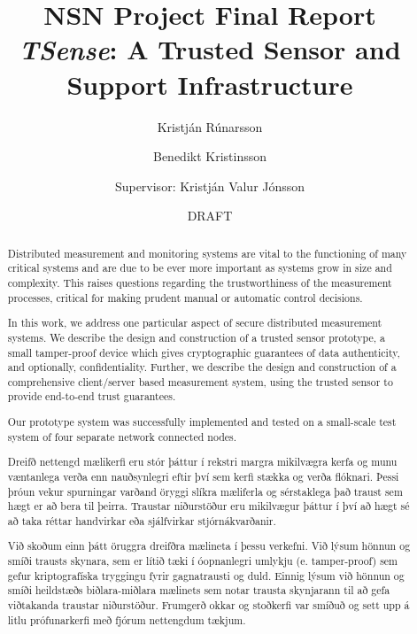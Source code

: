 \documentclass[10pt,titlepage,twoside,a4paper]{report}
\author{Kristj\'{a}n R\'{u}narsson \and Benedikt Kristinsson\\\and Supervisor: Kristj\'{a}n Valur J\'{o}nsson}
\title{NSN Project Final Report\\\textit{TSense}: A Trusted Sensor and Support Infrastructure}
\date{DRAFT}
\begin{document}
\maketitle
\begin{titlepage}
\end{titlepage}
\newpage
\ \ \ \\
\newpage

\setcounter{page}{1}

\tableofcontents

\begin{abstract}
Distributed measurement and monitoring systems are vital to the functioning of many critical systems and are due to be ever more important as systems grow in size and complexity. This raises questions regarding the trustworthiness of the measurement processes, critical for making prudent manual or automatic control decisions. 

In this work, we address one particular aspect of secure distributed measurement systems. We describe the design and construction of a trusted sensor prototype, a small tamper-proof device which gives cryptographic guarantees of data authenticity, and optionally, confidentiality. Further, we describe the design and construction of a comprehensive client/server based measurement system, using the trusted sensor to provide end-to-end trust guarantees. 


%
Our prototype system was successfully implemented and tested on a small-scale test system of four separate network connected nodes.
\end{abstract}

\renewcommand{\abstractname}{{\'{U}}tdr\'{a}ttur}
\begin{abstract}
Dreifð nettengd mælikerfi eru stór þáttur í rekstri margra mikilvægra kerfa og munu væntanlega verða enn nauðsynlegri eftir því sem kerfi stækka og verða flóknari. Þessi þróun vekur spurningar varðand öryggi slíkra mæliferla og sérstaklega það traust sem hægt er að bera til þeirra. Traustar niðurstöður eru mikilvægur þáttur í því að hægt sé að taka réttar handvirkar eða sjálfvirkar stjórnákvarðanir.

Við skoðum einn þátt öruggra dreifðra mælineta í þessu verkefni. Við lýsum hönnun og smíði trausts skynara, sem er lítið tæki í óopnanlegri umlykju (e. tamper-proof) sem gefur kriptografíska tryggingu fyrir gagnatrausti og duld. Einnig lýsum við hönnun og smíði heildstæðs biðlara-miðlara mælinets sem  notar trausta skynjarann til að gefa viðtakanda traustar niðurstöður.
%
Frumgerð okkar og stoðkerfi var smíðuð og sett upp á litlu prófunarkerfi með fjórum nettengdum tækjum.
\end{abstract}

\setcounter{page}{1}
\pagestyle{headings}








\end{document}
